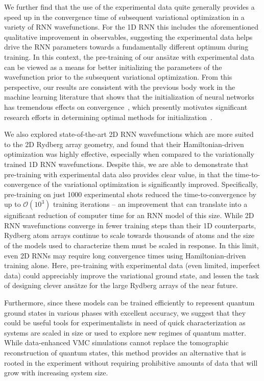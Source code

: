 \documentclass[twocolumn,
                showpacs,
                nofootinbib,
                nobibnotes,
                aps,
                superscriptaddress,
                amssymb,
                amsmath,
                floatfix,
                reprint,
                prx, 
                notitlepage,
                showkeys,
                10pt,
		]{revtex4-2}
\begin{document}
We further find that the use of the experimental data quite generally provides a speed up in the convergence time of subsequent variational optimization in a variety of RNN wavefunctions. For the 1D RNN this includes the aforementioned qualitative improvement in observables, suggesting the experimental data helps drive the RNN parameters towards a fundamentally different optimum during training. 
In this context, the pre-training of our ans\"atze with experimental data can be viewed as a means for better initializing the parameters of the wavefunction prior to the subsequent variational optimization. From this perspective, our results are consistent with the previous body work in the machine learning literature that shows that the initialization of neural networks has tremendous effects on convergence~\cite{pmlr-v9-glorot10a,pretrain}, which presently motivates significant research efforts in determining optimal methods for initialization~\cite{initializationreview}.


We also explored state-of-the-art 2D RNN wavefunctions which are more suited to the 2D Rydberg array geometry, and found that their Hamiltonian-driven optimization was highly effective, especially when compared to the variationally trained 1D RNN wavefunctions. Despite this, we are able to demonstrate that pre-training with experimental data also provides clear value, in that the time-to-convergence of the variational optimization is significantly improved.
Specifically, pre-training on just 1000 experimental shots reduced the time-to-convergence by up to $\mathcal{O}(10^3)$ training iterations -- an improvement that can translate into a significant reduction of computer time for an RNN model of this size.
While 2D RNN wavefunctions converge in fewer training steps than their 1D counterparts, Rydberg atom arrays continue to scale towards thousands of atoms and the size of the models used to characterize them must be scaled in response.  
In this limit, even 2D RNNs may require long convergence times using Hamiltonian-driven training alone. 
Here, pre-training with experimental data (even limited, imperfect data) could appreciably improve the variational ground state, and lessen the task of designing clever ans\"atze for the large Rydberg arrays of the near future.


Furthermore, since these models can be trained efficiently to represent quantum ground states in various phases with excellent accuracy, we suggest that they could be useful tools for experimentalists in need of quick characterization as systems are scaled in size or used to explore new regimes of quantum matter. While data-enhanced VMC simulations cannot replace the tomographic reconstruction of quantum states, this method provides an alternative that is rooted in the experiment without requiring prohibitive amounts of data that will grow with increasing system size. 
\end{document}
